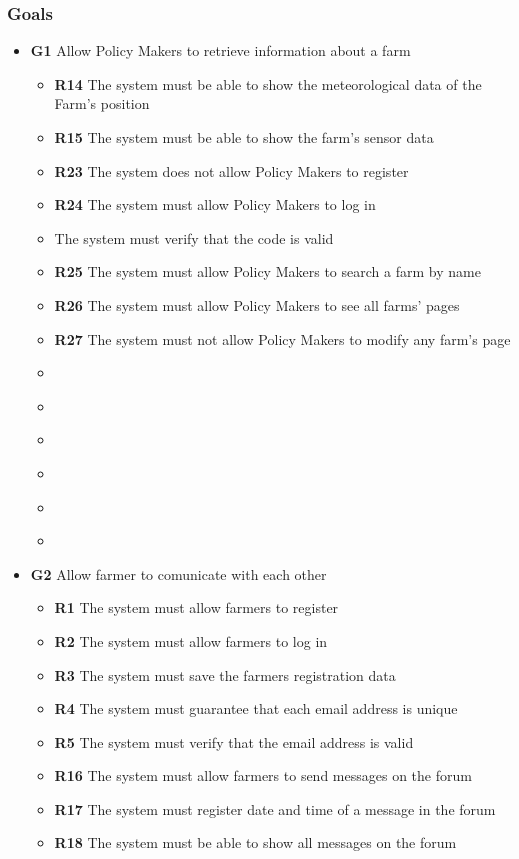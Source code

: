 \subsubsection{Goals}
\begin{itemize}   
\item \textbf{G1} Allow Policy Makers to retrieve information about a farm
    \begin{itemize}
        \renewcommand\labelitemi{--}
        \item \textbf{R14} The system must be able to show the meteorological data of the Farm’s position
        \item \textbf{R15} The system must be able to show the farm’s sensor data
        \item \textbf{R23} The system does not allow Policy Makers to register
        \item \textbf{R24} The system must allow Policy Makers to log in
        \item \textbf{} The system must verify that the code is valid
        \item \textbf{R25} The system must allow Policy Makers to search a farm by name
        \item \textbf{R26} The system must allow Policy Makers to see all farms’ pages
        \item \textbf{R27} The system must not allow Policy Makers to modify any farm’s page
        \item \textbf{}
        \item \textbf{}
        \item \textbf{}
        \item \textbf{}
        \item \textbf{}
        \item \textbf{}
    \end{itemize}

\item \textbf{G2} Allow farmer to comunicate with each other
    \begin{itemize}
        \renewcommand\labelitemi{--}
        \item \textbf{R1} The system must allow farmers to register
        \item \textbf{R2} The system must allow farmers to log in
        \item \textbf{R3} The system must save the farmers registration data
        \item \textbf{R4} The system must guarantee that each email address is unique
        \item \textbf{R5} The system must verify that the email address is valid
        \item \textbf{R16} The system must allow farmers to send messages on the forum
        \item \textbf{R17} The system must register date and time of a message in the forum
        \item \textbf{R18} The system must be able to show all messages on the forum
    \end{itemize}    


\end{itemize}

